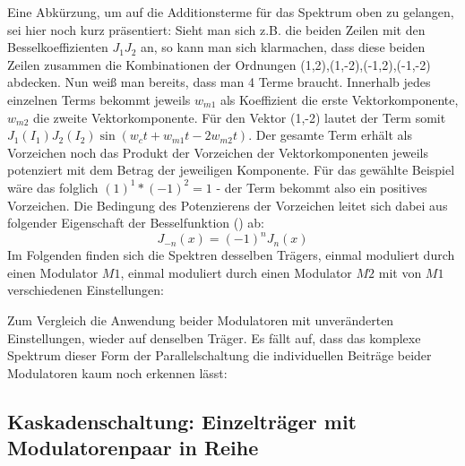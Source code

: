 Eine Abkürzung, um auf die Additionsterme für das Spektrum oben zu gelangen, sei hier noch kurz präsentiert: Sieht man sich z.B. die beiden Zeilen mit den Besselkoeffizienten \begin{math} J_1J_2 \end{math} an, so kann man sich klarmachen, dass diese beiden Zeilen zusammen die Kombinationen der Ordnungen (1,2),(1,-2),(-1,2),(-1,-2) abdecken. Nun weiß man bereits, dass man 4 Terme braucht. Innerhalb jedes einzelnen Terms bekommt jeweils \begin{math} w_{m1} \end{math} als Koeffizient die erste Vektorkomponente, \begin{math} w_{m2} \end{math} die zweite Vektorkomponente. Für den Vektor (1,-2) lautet der Term somit \begin{math} J_1(I_1)J_2(I_2)\sin(w_ct + w_{m1}t - 2w_{m2}t) \end{math}. Der gesamte Term erhält als Vorzeichen noch das Produkt der Vorzeichen der Vektorkomponenten jeweils potenziert mit dem Betrag der jeweiligen Komponente. Für das gewählte Beispiel wäre das folglich \begin{math} (1)^1*(-1)^2 = 1 \end{math} - der Term bekommt also ein positives Vorzeichen. Die Bedingung des Potenzierens der Vorzeichen leitet sich dabei aus folgender Eigenschaft der Besselfunktion (\cite[S.358, Satz~9.1.5]{abramowitz}) ab:
\begin{equation}
J_{-n}(x) = (-1)^nJ_n(x)
\end{equation}
Im Folgenden finden sich die Spektren desselben Trägers, einmal moduliert durch einen Modulator $M1$, einmal moduliert durch einen Modulator $M2$ mit von $M1$ verschiedenen Einstellungen:

Zum Vergleich die Anwendung beider Modulatoren mit unveränderten Einstellungen, wieder auf denselben Träger. Es fällt auf, dass das komplexe Spektrum dieser Form der Parallelschaltung die individuellen Beiträge beider Modulatoren kaum noch erkennen lässt:


\subsection{Kaskadenschaltung: Einzelträger mit Modulatorenpaar in Reihe}
\label{cascade}

